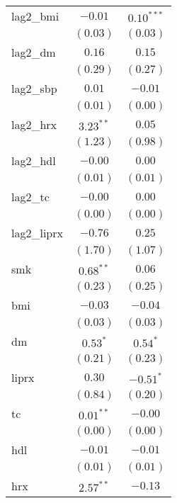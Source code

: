 \begin{tabular}{l c c}
lag2\_bmi             & $-0.01$       & $0.10^{***}$  \\
                      & $(0.03)$      & $(0.03)$      \\
lag2\_dm              & $0.16$        & $0.15$        \\
                      & $(0.29)$      & $(0.27)$      \\
lag2\_sbp             & $0.01$        & $-0.01$       \\
                      & $(0.01)$      & $(0.00)$      \\
lag2\_hrx             & $3.23^{**}$   & $0.05$        \\
                      & $(1.23)$      & $(0.98)$      \\
lag2\_hdl             & $-0.00$       & $0.00$        \\
                      & $(0.01)$      & $(0.01)$      \\
lag2\_tc              & $-0.00$       & $0.00$        \\
                      & $(0.00)$      & $(0.00)$      \\
lag2\_liprx           & $-0.76$       & $0.25$        \\
                      & $(1.70)$      & $(1.07)$      \\
smk                   & $0.68^{**}$   & $0.06$        \\
                      & $(0.23)$      & $(0.25)$      \\
bmi                   & $-0.03$       & $-0.04$       \\
                      & $(0.03)$      & $(0.03)$      \\
dm                    & $0.53^{*}$    & $0.54^{*}$    \\
                      & $(0.21)$      & $(0.23)$      \\
liprx                 & $0.30$        & $-0.51^{*}$   \\
                      & $(0.84)$      & $(0.20)$      \\
tc                    & $0.01^{**}$   & $-0.00$       \\
                      & $(0.00)$      & $(0.00)$      \\
hdl                   & $-0.01$       & $-0.01$       \\
                      & $(0.01)$      & $(0.01)$      \\
hrx                   & $2.57^{**}$   & $-0.13$       \\

\end{tabular}
